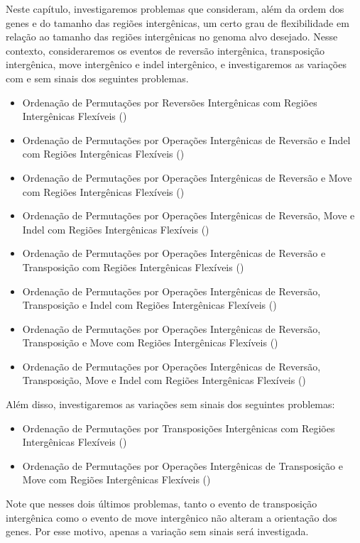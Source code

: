 
Neste capítulo, investigaremos problemas que consideram, além da ordem dos genes e do tamanho das regiões intergênicas, um certo grau de flexibilidade em relação ao tamanho das regiões intergênicas no genoma alvo desejado. Nesse contexto, consideraremos os eventos de reversão intergênica, transposição intergênica, move intergênico e indel intergênico, e investigaremos as variações com e sem sinais dos seguintes problemas.

\begin{itemize}
  \item Ordenação de Permutações por Reversões Intergênicas com Regiões Intergênicas Flexíveis (\SbFIR)
  \item Ordenação de Permutações por Operações Intergênicas de Reversão e Indel com Regiões Intergênicas Flexíveis (\SbFIRI)
  \item Ordenação de Permutações por Operações Intergênicas de Reversão e Move com Regiões Intergênicas Flexíveis (\SbFIRM)
  \item Ordenação de Permutações por Operações Intergênicas de Reversão, Move e Indel com Regiões Intergênicas Flexíveis (\SbFIRMI)
  \item Ordenação de Permutações por Operações Intergênicas de Reversão e Transposição com Regiões Intergênicas Flexíveis (\SbFIRT)
  \item Ordenação de Permutações por Operações Intergênicas de Reversão, Transposição e Indel com Regiões Intergênicas Flexíveis (\SbFIRTI)
  \item Ordenação de Permutações por Operações Intergênicas de Reversão, Transposição e Move com Regiões Intergênicas Flexíveis (\SbFIRTM)
  \item Ordenação de Permutações por Operações Intergênicas de Reversão, Transposição, Move e Indel com Regiões Intergênicas Flexíveis (\SbFIRTMI)
\end{itemize}

Além disso, investigaremos as variações sem sinais dos seguintes problemas:

\begin{itemize}
  \item Ordenação de Permutações por Transposições Intergênicas com Regiões Intergênicas Flexíveis (\SbFIT)
  \item Ordenação de Permutações por Operações Intergênicas de Transposição e Move com Regiões Intergênicas Flexíveis (\SbFITM)
\end{itemize}

Note que nesses dois últimos problemas, tanto o evento de transposição intergênica como o evento de move intergênico não alteram a orientação dos genes. Por esse motivo, apenas a variação sem sinais será investigada.

